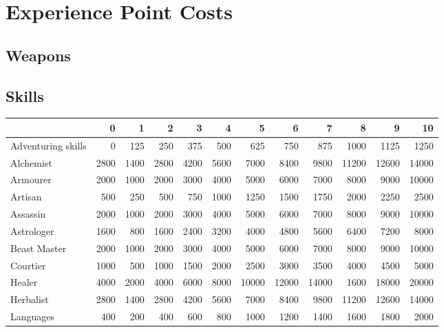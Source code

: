 \section{Experience Point Costs}
\label{tables:ep}

\subsection{Weapons}

\subsection{Skills}
\label{epcosts:skills}
{
\renewcommand{\thefootnote}{\Alph{footnote}}
\begin{tabularx}{\linewidth}{Xrrrrrrrrrrr}
& {\bf 0} & {\bf 1} & {\bf 2} &{\bf 3}&{\bf 4}&{\bf 5}&{\bf 6}&{\bf 7}&{\bf 8}& {\bf 9} & {\bf 10} \\
\hline
Adventuring skills\footnotemark[1]	& 0	& 125	& 250	& 375	& 500	& 625	& 750	& 875	& 1000	& 1125	& 1250	\\ \hline
Alchemist				& 2800	& 1400	& 2800	& 4200	& 5600	& 7000	& 8400	& 9800	& 11200	& 12600	& 14000	\\ \hline
Armourer				& 2000	& 1000	& 2000	& 3000	& 4000	& 5000	& 6000	& 7000	& 8000	& 9000	& 10000	\\ \hline
Artisan					& 500	& 250	& 500	& 750	& 1000	& 1250	& 1500	& 1750	& 2000	& 2250	& 2500	\\ \hline
Assassin				& 2000	& 1000	& 2000	& 3000	& 4000	& 5000	& 6000	& 7000	& 8000	& 9000	& 10000	\\ \hline
Astrologer				& 1600	& 800	& 1600	& 2400	& 3200	& 4000	& 4800	& 5600	& 6400	& 7200	& 8000	\\ \hline
Beast Master\footnotemark[2]		& 2000	& 1000	& 2000	& 3000	& 4000	& 5000	& 6000	& 7000	& 8000	& 9000	& 10000	\\ \hline
Courtier\footnotemark[3]		& 1000	& 500	& 1000	& 1500	& 2000	& 2500	& 3000	& 3500	& 4000	& 4500	& 5000	\\ \hline
Healer					& 4000	& 2000	& 4000	& 6000	& 8000	& 10000	& 12000	& 14000	& 1600	& 18000	& 20000	\\ \hline
Herbalist				& 2800	& 1400	& 2800	& 4200	& 5600	& 7000	& 8400	& 9800	& 11200	& 12600	& 14000	\\ \hline	
Languages				& 400	& 200	& 400	& 600	& 800	& 1000	& 1200	& 1400	& 1600	& 1800	& 2000	\\ \hline

\end{tabularx}}
